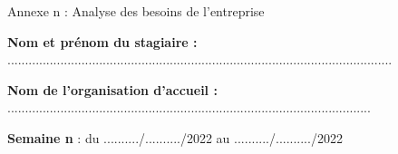 \documentclass[a4paper,11pt]{article}
\makeatletter
\newcommand{\mktitle}{\@maketitle}
\makeatother
\begin{document}
\begin{center}\LARGE Annexe n : Analyse des besoins de l'entreprise\end{center}
\newpage

\mktitle\vspace{-.2cm}

\noindent\textbf{Nom et prénom du stagiaire :} .............................................................................................................\vspace{.4cm}

\noindent\textbf{Nom de l'organisation d'accueil :} .......................................................................................................\vspace{.4cm}

\noindent\textbf{Semaine n} : du ........../........../2022 au ........../........../2022\vspace{-.2cm}
\end{document}
